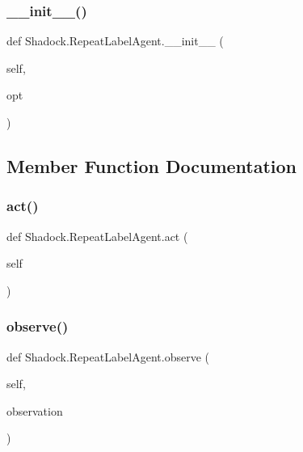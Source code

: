 \subsubsection{\texorpdfstring{\+\_\+\+\_\+init\+\_\+\+\_\+()}{\_\_init\_\_()}}
{\footnotesize\ttfamily def Shadock.\+Repeat\+Label\+Agent.\+\_\+\+\_\+init\+\_\+\+\_\+ (\begin{DoxyParamCaption}\item[{}]{self,  }\item[{}]{opt }\end{DoxyParamCaption})}



\subsection{Member Function Documentation}
\mbox{\label{classShadock_1_1RepeatLabelAgent_afdec22b589734f9af92ef4234df5d5a1}} 
\subsubsection{\texorpdfstring{act()}{act()}}
{\footnotesize\ttfamily def Shadock.\+Repeat\+Label\+Agent.\+act (\begin{DoxyParamCaption}\item[{}]{self }\end{DoxyParamCaption})}

\mbox{\label{classShadock_1_1RepeatLabelAgent_ae01ff4d505267990982ec0565dccd61d}} 
\subsubsection{\texorpdfstring{observe()}{observe()}}
{\footnotesize\ttfamily def Shadock.\+Repeat\+Label\+Agent.\+observe (\begin{DoxyParamCaption}\item[{}]{self,  }\item[{}]{observation }\end{DoxyParamCaption})}



